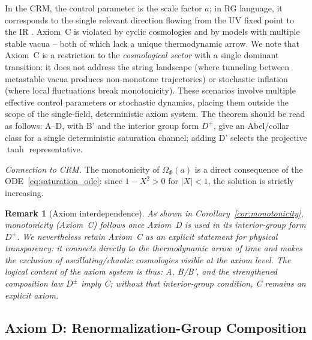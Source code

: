\documentclass[aps,prd,twocolumn,superscriptaddress,nofootinbib]{revtex4-2}
\newtheorem{remark}{Remark}
\begin{document}
In the CRM, the control parameter is the scale factor $a$; in RG language, it corresponds to the single relevant direction flowing from the UV fixed point to the IR \cite{Percacci2017}. Axiom~C is violated by cyclic cosmologies and by models with multiple stable vacua -- both of which lack a unique thermodynamic arrow. We note that Axiom~C is a restriction to the \textit{cosmological sector} with a single dominant transition: it does not address the string landscape (where tunneling between metastable vacua produces non-monotone trajectories) or stochastic inflation (where local fluctuations break monotonicity). These scenarios involve multiple effective control parameters or stochastic dynamics, placing them outside the scope of the single-field, deterministic axiom system. The theorem should be read as follows: A--D, with B' and the interior group form $D^\pm$, give an Abel/collar class for a single deterministic saturation channel; adding D' selects the projective $\tanh$ representative.

\textit{Connection to CRM.} The monotonicity of $\Omega_\Phi(a)$ is a direct consequence of the ODE~\eqref{eq:saturation_ode}: since $1 - X^2 > 0$ for $|X| < 1$, the solution is strictly increasing.

\begin{remark}[Axiom interdependence]
As shown in Corollary~\ref{cor:monotonicity}, monotonicity (Axiom~C) follows once Axiom~D is used in its interior-group form $D^\pm$. We nevertheless retain Axiom~C as an explicit statement for physical transparency: it connects directly to the thermodynamic arrow of time and makes the exclusion of oscillating/chaotic cosmologies visible at the axiom level. The logical content of the axiom system is thus: A, B/B', and the strengthened composition law $D^\pm$ imply C; without that interior-group condition, C remains an explicit axiom.
\end{remark}

\subsection{Axiom D: Renormalization-Group Composition}
\end{document}
